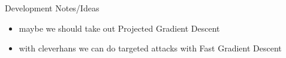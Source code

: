 \documentclass{article}
\begin{document}
    


\tableofcontents
\vspace{1in}
{\Large \noindent Development Notes/Ideas}
\begin{itemize}
    \item maybe we should take out Projected Gradient Descent
    \item with cleverhans we can do targeted attacks with Fast Gradient Descent
\end{itemize}

\setlength{\parskip}{1em} %

\pagebreak

\pagebreak

\pagebreak




\pagebreak
\printbibliography
\end{document}
